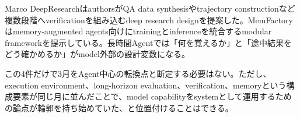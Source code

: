 Marco DeepResearchはauthorsがQA data synthesisやtrajectory constructionなど複数段階へverificationを組み込むdeep research designを提案した。MemFactoryはmemory-augmented agents向けにtrainingとinferenceを統合するmodular frameworkを提示している。長時間Agentでは「何を覚えるか」と「途中結果をどう確かめるか」がmodel外部の設計変数になる。\autocite{src-2b8b39e5cae3,src-42318ebdee75}


この4件だけで3月をAgent中心の転換点と断定する必要はない。ただし、execution environment、long-horizon evaluation、verification、memoryという構成要素が同じ月に並んだことで、model capabilityをsystemとして運用するための論点が輪郭を持ち始めていた、と位置付けることはできる。\autocite{src-01572b4c34e9,src-0ec537ec1cc1,src-2b8b39e5cae3,src-42318ebdee75}


